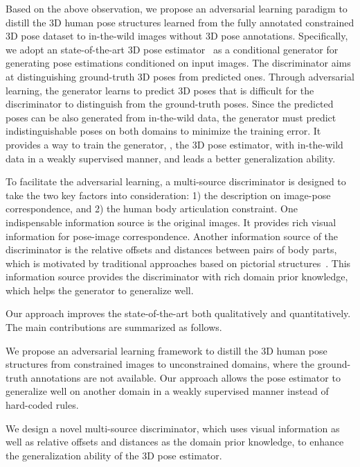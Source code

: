 \documentclass[10pt,twocolumn,letterpaper]{article}
\newenvironment{myitemize}[1][]{
	\begin{list}{{#1}} 
		{
			\setlength{\leftmargin}{1.2em}
			\setlength{\topsep}{0em}
			\setlength{\itemsep}{-0.2em}
	}}
{\end{list}}
\begin{document}
Based on the above observation, we propose an adversarial learning paradigm to distill the 3D human pose structures learned from the fully annotated constrained 3D pose dataset to in-the-wild images without 3D pose annotations. 
Specifically, we adopt an state-of-the-art 3D pose estimator~\cite{zhou2017towards} as a conditional generator for generating pose estimations conditioned on input images. 
The discriminator aims at distinguishing ground-truth 3D poses from predicted ones. Through adversarial learning, the generator learns to predict 3D poses that is difficult for the discriminator to distinguish from the ground-truth poses. 
Since the predicted poses can be also generated from in-the-wild data, the generator must predict indistinguishable poses on both domains to minimize the training error. 
It provides a way to train the generator, \ie, the 3D pose estimator, with in-the-wild data in a weakly supervised manner, and leads a better generalization ability. 


To facilitate the adversarial learning, a multi-source discriminator is designed to take the two key factors into consideration: 1) the description on image-pose correspondence, and 2) the human body articulation constraint. 
One indispensable information source is the original images. 
It provides rich visual information for pose-image correspondence.  
Another information source of the discriminator is the relative offsets and distances between pairs of body parts, which is motivated by traditional approaches based on pictorial structures~\cite{fischler1973representation,yang2011articulated,chen2014articulated,pishchulin2013poselet}. 
This information source provides the discriminator with rich domain prior knowledge, which helps the generator to generalize well. 


Our approach improves the state-of-the-art both qualitatively and quantitatively. 
The main contributions are summarized as follows.
\begin{myitemize}
	\item[] We propose an adversarial learning framework to distill the 3D human pose structures from constrained images to unconstrained domains, 
where the ground-truth annotations are not available. 
	Our approach allows the pose estimator to generalize well on another domain in a weakly supervised manner instead of hard-coded rules. 
	
	\item[] We design a novel multi-source discriminator, which uses visual information as well as relative offsets and distances as the domain prior knowledge, to enhance the generalization ability of the 3D pose estimator.
\end{myitemize}
\end{document}
